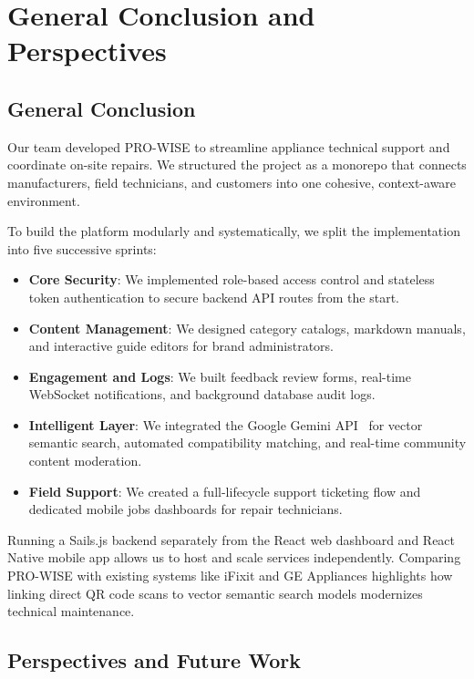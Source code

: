 \documentclass[12pt,a4paper]{report}
\begin{document}
\chapter*{General Conclusion and Perspectives}

\section*{General Conclusion}

Our team developed PRO-WISE to streamline appliance technical support and coordinate on-site repairs. We structured the project as a monorepo that connects manufacturers, field technicians, and customers into one cohesive, context-aware environment.

To build the platform modularly and systematically, we split the implementation into five successive sprints:
\begin{itemize}
    \item \textbf{Core Security}: We implemented role-based access control and stateless token authentication to secure backend API routes from the start.
    \item \textbf{Content Management}: We designed category catalogs, markdown manuals, and interactive guide editors for brand administrators.
    \item \textbf{Engagement and Logs}: We built feedback review forms, real-time WebSocket notifications, and background database audit logs.
    \item \textbf{Intelligent Layer}: We integrated the Google Gemini API~\cite{gemini} for vector semantic search, automated compatibility matching, and real-time community content moderation.
    \item \textbf{Field Support}: We created a full-lifecycle support ticketing flow and dedicated mobile jobs dashboards for repair technicians.
\end{itemize}

Running a Sails.js backend separately from the React web dashboard and React Native mobile app allows us to host and scale services independently. Comparing PRO-WISE with existing systems like iFixit and GE Appliances highlights how linking direct QR code scans to vector semantic search models modernizes technical maintenance.

\section*{Perspectives and Future Work}
\end{document}

